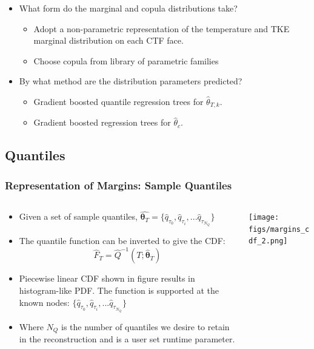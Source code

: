 \documentclass[t, pdftex]{beamer}
\begin{document}
\begin{frame}
{\begin{itemize}
        \item What form do the marginal and copula distributions take?
        \begin{itemize}
            \item Adopt a non-parametric representation of the temperature and TKE marginal distribution on each CTF face. 
            \item Choose copula from library of parametric families
        \end{itemize}        
        \item By what method are the distribution parameters predicted?
        \begin{itemize}
            \item Gradient boosted quantile regression trees for $\hat \theta_{T,k}$.
            \item Gradient boosted regression trees for $\hat \theta_{c}$.
        \end{itemize}
    \end{itemize}
}
\end{frame}

\subsection*{Quantiles}
\begin{frame}
\frametitle{Representation of Margins: Sample Quantiles}
\vspace{-15pt}
    \begin{columns}
        \begin{column}{0.5\textwidth}
            \scriptsize{
                \begin{itemize}
                    \item Given a set of sample quantiles, $\hat{\mathbf{\theta}_T} = \{\hat q_{\tau_0}, \hat q_{\tau_i}, ... \hat{q}_{\tau_{N_Q}} \}$
                    \item The quantile function can be inverted to give the CDF:
                    \[
                    \hat F_T = \hat{Q}^{-1}(T; \mathbf{\hat \theta}_T)
                    \]
                    \item Piecewise linear CDF shown in figure results in histogram-like PDF.  The function is supported at the known nodes: $\{ \hat q_{\tau_0}, \hat q_{\tau_i}, ... \hat q_{\tau_{N_Q}} \}$
                    \item Where $N_{Q}$ is the number of quantiles we desire to retain in the reconstruction and is a user set runtime parameter.
                \end{itemize}
            }
        \end{column}
        \begin{column}{0.5\textwidth}  %
            \begin{center}
                \texttt{[image: figs/margins\_cdf\_2.png]}
            \end{center}
        \end{column}
    \end{columns}
\end{frame}
\end{document}
